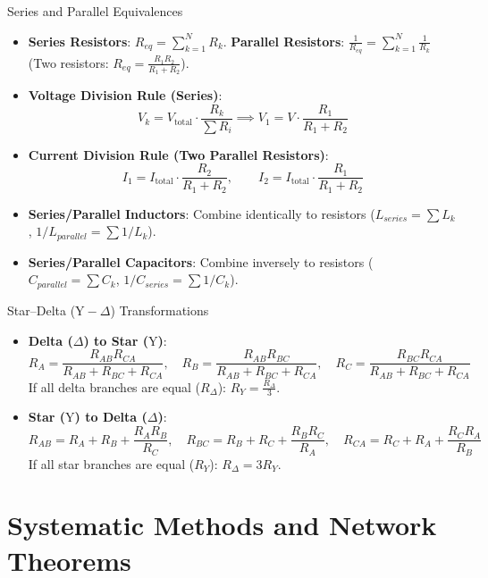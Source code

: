\begin{formulabox}{Series and Parallel Equivalences}
\begin{itemize}[leftmargin=1.5em]
    \item \textbf{Series Resistors}: $R_{eq} = \sum_{k=1}^N R_k$. \quad \textbf{Parallel Resistors}: $\frac{1}{R_{eq}} = \sum_{k=1}^N \frac{1}{R_k}$ \quad (Two resistors: $R_{eq} = \frac{R_1 R_2}{R_1 + R_2}$).
    \item \textbf{Voltage Division Rule (Series)}:
    \[ V_k = V_{\text{total}} \cdot \frac{R_k}{\sum R_i} \implies V_1 = V \cdot \frac{R_1}{R_1 + R_2} \]
    \item \textbf{Current Division Rule (Two Parallel Resistors)}:
    \[ I_1 = I_{\text{total}} \cdot \frac{R_2}{R_1 + R_2}, \qquad I_2 = I_{\text{total}} \cdot \frac{R_1}{R_1 + R_2} \]
    \item \textbf{Series/Parallel Inductors}: Combine identically to resistors ($L_{series} = \sum L_k$, $1/L_{parallel} = \sum 1/L_k$).
    \item \textbf{Series/Parallel Capacitors}: Combine inversely to resistors ($C_{parallel} = \sum C_k$, $1/C_{series} = \sum 1/C_k$).
\end{itemize}
\end{formulabox}

\begin{formulabox}{Star--Delta ($\text{Y}-\Delta$) Transformations}
\begin{itemize}[leftmargin=1.5em]
    \item \textbf{Delta ($\Delta$) to Star ($\text{Y}$)}:
    \[ R_A = \frac{R_{AB} R_{CA}}{R_{AB} + R_{BC} + R_{CA}}, \quad R_B = \frac{R_{AB} R_{BC}}{R_{AB} + R_{BC} + R_{CA}}, \quad R_C = \frac{R_{BC} R_{CA}}{R_{AB} + R_{BC} + R_{CA}} \]
    If all delta branches are equal ($R_\Delta$): $R_Y = \frac{R_\Delta}{3}$.
    \item \textbf{Star ($\text{Y}$) to Delta ($\Delta$)}:
    \[ R_{AB} = R_A + R_B + \frac{R_A R_B}{R_C}, \quad R_{BC} = R_B + R_C + \frac{R_B R_C}{R_A}, \quad R_{CA} = R_C + R_A + \frac{R_C R_A}{R_B} \]
    If all star branches are equal ($R_Y$): $R_\Delta = 3 R_Y$.
\end{itemize}
\end{formulabox}

\section{Systematic Methods and Network Theorems}

